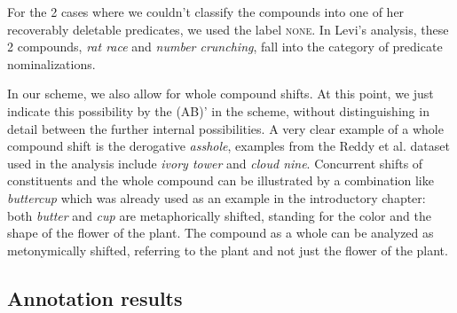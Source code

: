 For the 2 cases where we couldn't classify
the compounds into one of her recoverably deletable predicates, we used the label
\textsc{none}. In Levi's analysis, these 2 compounds, \emph{rat
  race} and \emph{number crunching}, fall into the category of
predicate nominalizations. 
 


In our scheme, we also allow for whole compound shifts. At this point, we just
indicate this possibility by the (AB)' in the scheme, without distinguishing
in detail between the further internal possibilities. A very clear example of
a whole compound shift is the derogative \emph{asshole}, examples from the
Reddy et al. dataset used in the analysis include \emph{ivory tower}
and \emph{cloud nine}. Concurrent shifts of constituents and the whole
compound can be illustrated by a combination like
\emph{buttercup} which was already used as an example in the
introductory chapter: both \emph{butter} and \emph{cup} are
metaphorically shifted, standing for the color and the shape of the
flower of the plant. The compound as a whole can be analyzed as
metonymically shifted, referring to the plant and not just the flower
of the plant. 

\subsection{Annotation results}
\label{sec:bell-schaefer-annotation-results}

